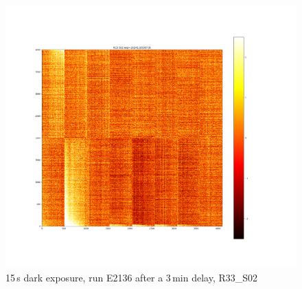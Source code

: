 \begin{figure}[htbp]
\vspace{0.5cm}

\begin{minipage}{0.45\textwidth}
    \centering
    \includegraphics[width=\textwidth]{sections/figures/E2136_dark15_delay_R33_S02.png}
    \caption{15\,s dark exposure, run E2136 after a 3\,min delay, R33\_S02}
    \label{fig:r33_s02_2136_delay}
\end{minipage}
\hfill
\begin{minipage}{0.45\textwidth}
    \centering
\end{minipage}
\end{figure}

%
%

